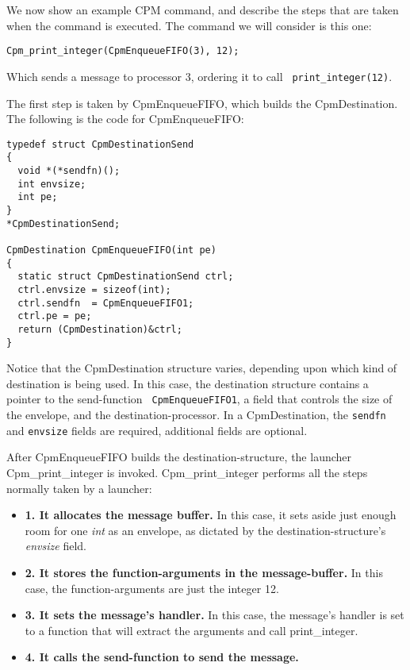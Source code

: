 We now show an example CPM command, and describe the steps that are
taken when the command is executed.  The command we will consider is
this one:

\begin{verbatim}
Cpm_print_integer(CpmEnqueueFIFO(3), 12);
\end{verbatim}

Which sends a message to processor 3, ordering it to call {\tt
print\_integer(12)}.

The first step is taken by CpmEnqueueFIFO, which builds the
CpmDestination.  The following is the code for CpmEnqueueFIFO:

\pagebreak

\begin{verbatim}
typedef struct CpmDestinationSend
{
  void *(*sendfn)();
  int envsize;
  int pe;
}
*CpmDestinationSend;

CpmDestination CpmEnqueueFIFO(int pe)
{
  static struct CpmDestinationSend ctrl;
  ctrl.envsize = sizeof(int);
  ctrl.sendfn  = CpmEnqueueFIFO1;
  ctrl.pe = pe;
  return (CpmDestination)&ctrl;
}
\end{verbatim}

Notice that the CpmDestination structure varies, depending upon which
kind of destination is being used.  In this case, the destination
structure contains a pointer to the send-function {\tt
CpmEnqueueFIFO1}, a field that controls the size of the envelope, and
the destination-processor.  In a CpmDestination, the {\tt sendfn} and
{\tt envsize} fields are required, additional fields are optional.

After CpmEnqueueFIFO builds the destination-structure, the launcher
Cpm\_print\_integer is invoked.  Cpm\_print\_integer performs all the
steps normally taken by a launcher:

\begin{itemize}

\item[]{{\bf 1. It allocates the message buffer.}  In this case, it sets aside
just enough room for one {\it int} as an envelope, as dictated by the
destination-structure's {\it envsize} field.}

\item[]{{\bf 2. It stores the function-arguments in the message-buffer.}  In
this case, the function-arguments are just the integer 12.}

\item[]{{\bf 3. It sets the message's handler.}  In this case, the message's
handler is set to a function that will extract the arguments and call
print\_integer.}

\item[]{{\bf 4. It calls the send-function to send the message.}}
\end{itemize}

